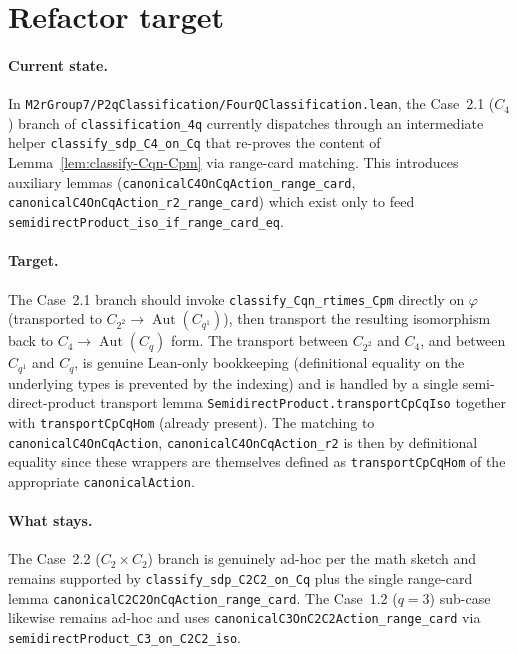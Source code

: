 \section{Refactor target}

\paragraph{Current state.} In
\texttt{M2rGroup7/P2qClassification/FourQClassification.lean}, the Case~2.1
($C_4$) branch of \texttt{classification\_4q} currently dispatches through an
intermediate helper \texttt{classify\_sdp\_C4\_on\_Cq} that re-proves the
content of Lemma~\ref{lem:classify-Cqn-Cpm} via range-card matching. This
introduces auxiliary lemmas
(\texttt{canonicalC4OnCqAction\_range\_card},
\texttt{canonicalC4OnCqAction\_r2\_range\_card}) which exist only to feed
\texttt{semidirectProduct\_iso\_if\_range\_card\_eq}.

\paragraph{Target.} The Case~2.1 branch should invoke
\texttt{classify\_Cqn\_rtimes\_Cpm} directly on $\varphi$ (transported to
$C_{2^2} \to \operatorname{Aut}(C_{q^1})$), then transport the resulting
isomorphism back to $C_4 \to \operatorname{Aut}(C_q)$ form. The transport
between $C_{2^2}$ and $C_4$, and between $C_{q^1}$ and $C_q$, is genuine
Lean-only bookkeeping (definitional equality on the underlying types is
prevented by the indexing) and is handled by a single semi-direct-product
transport lemma \texttt{SemidirectProduct.transportCpCqIso} together with
\texttt{transportCpCqHom} (already present). The matching to
\texttt{canonicalC4OnCqAction}, \texttt{canonicalC4OnCqAction\_r2} is then by
definitional equality since these wrappers are themselves defined as
\texttt{transportCpCqHom} of the appropriate \texttt{canonicalAction}.

\paragraph{What stays.} The Case~2.2 ($C_2 \times C_2$) branch is genuinely
ad-hoc per the math sketch and remains supported by
\texttt{classify\_sdp\_C2C2\_on\_Cq} plus the single range-card lemma
\texttt{canonicalC2C2OnCqAction\_range\_card}. The Case~1.2 ($q = 3$) sub-case
likewise remains ad-hoc and uses \texttt{canonicalC3OnC2C2Action\_range\_card}
via \texttt{semidirectProduct\_C3\_on\_C2C2\_iso}.

